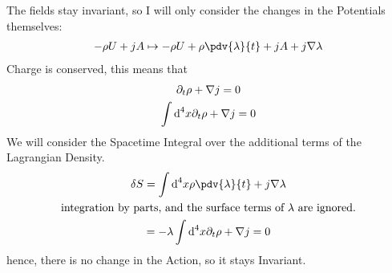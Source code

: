 \documentclass[]{scrartcl}
\begin{document}
The fields stay invariant, so I will only consider the changes in the Potentials themselves:
\begin{gather*}
	-\rho U + jA \mapsto -\rho U + \rho \pdv{\lambda}{t} + jA + j \nabla\lambda
\end{gather*}
Charge is conserved, this means that
\begin{gather*}
	\partial_t \rho + \nabla j = 0\\
	\int \text d^4x \partial_t \rho+ \nabla j = 0
\end{gather*}
We will consider the Spacetime Integral over the additional terms of the Lagrangian Density.
\begin{gather*}
	\delta S = \int \text d^4x \rho\pdv{\lambda}{t} + j\nabla\lambda\\
	\text{integration by parts, and the surface terms of $\lambda$ are ignored.}\\
	= -\lambda \int \text d^4x \partial_t \rho + \nabla j = 0
\end{gather*}
hence, there is no change in the Action, so it stays Invariant.
\end{document}
